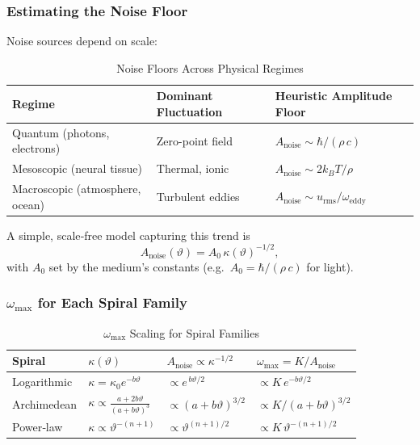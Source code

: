 \medskip
\subsubsection{Estimating the Noise Floor}

Noise sources depend on scale:

\begin{table}[H]
  \small
  \centering
  \caption{Noise Floors Across Physical Regimes}
  \label{tab:noise-floors}
  \begin{tabular}{@{}p{} p{} p{}@{}}
    \toprule
    \textbf{Regime} & \textbf{Dominant Fluctuation} & \textbf{Heuristic Amplitude Floor} \\
    \midrule
    Quantum (photons, electrons)
      & Zero-point field
      & \(A_{\mathrm{noise}}\sim \hbar/(\rho\,c)\) \\
    Mesoscopic (neural tissue)
      & Thermal, ionic
      & \(A_{\mathrm{noise}}\sim 2 k_{B}T/\rho\) \\
    Macroscopic (atmosphere, ocean)
      & Turbulent eddies
      & \(A_{\mathrm{noise}}\sim u_{\mathrm{rms}}/\omega_{\mathrm{eddy}}\) \\
    \bottomrule
  \end{tabular}
\end{table}

A simple, scale‐free model capturing this trend is
\[
  A_{\mathrm{noise}}(\vartheta)
  = A_{0}\,\kappa(\vartheta)^{-1/2},
  \tag{3.6}
\]
with \(A_{0}\) set by the medium’s constants (e.g.\ \(A_{0}=\hbar/(\rho\,c)\) for light).

\medskip
\subsubsection{\(\omega_{\max}\) for Each Spiral Family}

\begin{table}[H]
  \small
  \centering
  \caption{\(\omega_{\max}\) Scaling for Spiral Families}
  \label{tab:omega-max-scaling}
  \begin{tabular}{@{}p{} p{} p{} p{}@{}}
    \toprule
    \textbf{Spiral}
      & \(\kappa(\vartheta)\)
      & \(A_{\mathrm{noise}}\propto\kappa^{-1/2}\)
      & \(\omega_{\max}=K/A_{\mathrm{noise}}\) \\
    \midrule
    Logarithmic
      & \(\kappa=\kappa_{0}e^{-b\vartheta}\)
      & \(\propto e^{\,b\vartheta/2}\)
      & \(\propto K\,e^{-b\vartheta/2}\) \\
    Archimedean
      & \(\kappa\propto \tfrac{a+2b\vartheta}{(a+b\vartheta)^{3}}\)
      & \(\propto(a+b\vartheta)^{3/2}\)
      & \(\propto K/(a+b\vartheta)^{3/2}\) \\
    Power‐law
      & \(\kappa\propto\vartheta^{-(n+1)}\)
      & \(\propto\vartheta^{(n+1)/2}\)
      & \(\propto K\,\vartheta^{-(n+1)/2}\) \\
    \bottomrule
  \end{tabular}
\end{table}

